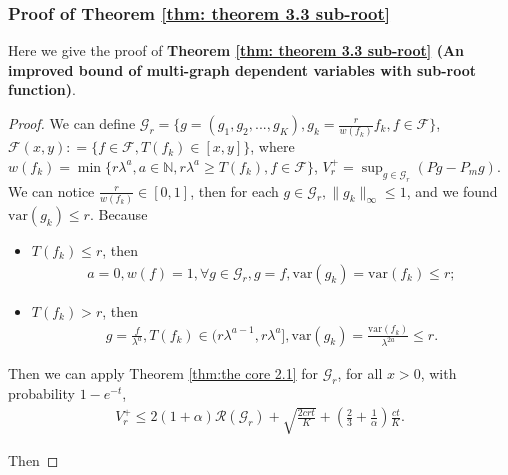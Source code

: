 \documentclass{article}
\def\vx{{\mathbf{x}}}
\def\eE{\mathbb{E}}
\begin{document}
\subsubsection{Proof of Theorem \ref{thm: theorem 3.3 sub-root}}
\label{pro:theorem3.3_proof}
Here we give the proof of \textbf{Theorem \ref{thm: theorem 3.3 sub-root} (An improved bound of multi-graph dependent variables with sub-root function)}.
\begin{proof} 
We can define $\mathcal{G}_r = \{ g = (g_1,g_2,... ,g_K), g_k = \frac{r}{w(f_k)}f_k, f \in \mathcal{F} \} $,  $\mathcal{F}(x,y): = \{ f \in \mathcal{F}, T(f_k) \in [x,y] \} $, where $w(f_k) = \min \{r\lambda ^a, a \in \mathbb{N}, r\lambda ^a \geq T(f_k), f \in \mathcal{F} \}$, $V_r^+ = \sup _{g \in \mathcal{G}_r} (P g - P _m g)$. We can notice $\frac{r}{w(f_k)} \in [0,1]$, then for each $g \in \mathcal{G}_r,  \| g_k\|_ \infty \leq 1$, and we found $\mathrm{var}(g_k) \leq r$. Because

\begin{itemize}
    \item $T(f_k) \leq r$,
then
    \begin{align*}
        a = 0, w(f) = 1,
        \forall g \in \mathcal{G}_r, g = f ,
        \mathrm{var}(g_k) = \mathrm{var}(f_k) \leq r;
    \end{align*}

    \item $T(f_k) >r$,
then
    \begin{align*}
        g = \frac{f}{\lambda^a}, T(f_k) \in (r \lambda^{a-1}, r\lambda^a], 
        \mathrm{var}(g_k) = \frac{\mathrm{var}(f_k)}{\lambda^{2a}} \leq r.
    \end{align*}
\end{itemize}


Then we can apply Theorem \ref{thm:the core 2.1} for $\mathcal{G}_r$, for all $x > 0$, with probability $1 - e^{-t}$,
\begin{align*} 
    V_r^+ \leq 2(1+\alpha) \mathcal{R}(\mathcal{G}_r) +\sqrt{\frac{2crt}{K}} + (\frac{2}{3} +\frac{1}{\alpha}) \frac{ct}{K}.   
\end{align*}


Then


\end{proof}
\end{document}
